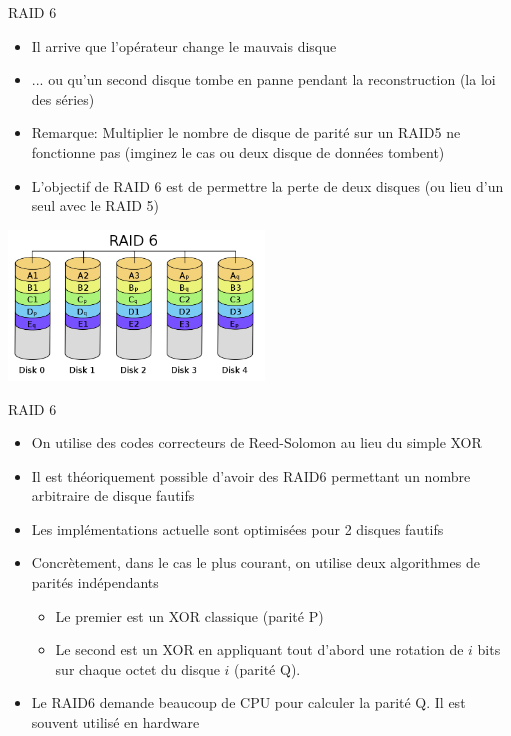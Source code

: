 \begin{frame}[fragile=singleslide]{RAID 6}
  \begin{itemize}
  \item Il arrive que l'opérateur change le mauvais disque
  \item  ...  ou  qu'un  second  disque  tombe  en  panne  pendant  la
    reconstruction (la loi des séries)
  \item  Remarque: Multiplier  le nombre  de disque  de parité  sur un
    RAID5 ne fonctionne pas (imginez  le cas ou deux disque de données
    tombent)
  \item L'objectif de RAID 6 est de permettre la perte de deux disques
    (ou lieu d'un seul avec le RAID 5)
  \end{itemize}
  \begin{center}
    \includegraphics[height=4cm]{pics/RAID_6}
  \end{center}
\end{frame}

\begin{frame}[fragile=singleslide]{RAID 6}
  \begin{itemize}
  \item On  utilise des codes  correcteurs de Reed-Solomon au  lieu du
    simple XOR
  \item Il est théoriquement  possible d'avoir des RAID6 permettant un
    nombre arbitraire de disque fautifs
  \item Les  implémentations actuelle  sont optimisées pour  2 disques
    fautifs
  \item Concrètement,  dans le  cas le plus  courant, on  utilise deux
    algorithmes de parités indépendants
    \begin{itemize}
    \item Le premier est un XOR classique (parité P)
    \item Le second est un XOR en appliquant tout d'abord une rotation
      de $i$ bits sur chaque octet du disque $i$ (parité Q).
    \end{itemize} 
  \item Le RAID6 demande beaucoup de CPU pour calculer la parité Q. Il
    est souvent utilisé en hardware
  \end{itemize}
\end{frame}

